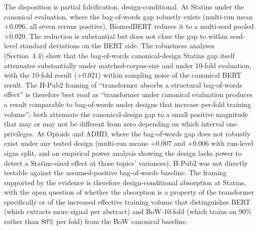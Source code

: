 \documentclass[11pt,a4paper]{article}
\begin{document}
The disposition is partial falsification, design-conditional. At Statins under the canonical evaluation, where the bag-of-words gap robustly exists (multi-run mean $+0.096$, all seven reruns positive), BiomedBERT reduces it to a multi-seed pooled $+0.020$. The reduction is substantial but does not close the gap to within seed-level standard deviations on the BERT side. The robustness analyses (Section~4.4) show that the bag-of-words canonical-design Statins gap itself attenuates substantially under matched-corpus-size and under 10-fold evaluation, with the 10-fold result ($+0.021$) within sampling noise of the canonical BERT result. The H-Pub2 framing of ``transformer absorbs a structural bag-of-words effect'' is therefore best read as ``transformer under canonical evaluation produces a result comparable to bag-of-words under designs that increase per-fold training volume''; both attenuate the canonical-design gap to a small positive magnitude that may or may not be different from zero depending on which interval one privileges. At Opioids and ADHD, where the bag-of-words gap does not robustly exist under any tested design (multi-run means $+0.007$ and $+0.006$ with run-level signs split, and an empirical power analysis showing the design lacks power to detect a Statins-sized effect at those topics' variances), H-Pub2 was not directly testable against the assumed-positive bag-of-words baseline. The framing supported by the evidence is therefore design-conditional absorption at Statins, with the open question of whether the absorption is a property of the transformer specifically or of the increased effective training volume that distinguishes BERT (which extracts more signal per abstract) and BoW-10-fold (which trains on 90\% rather than 80\% per fold) from the BoW canonical baseline.
\end{document}
